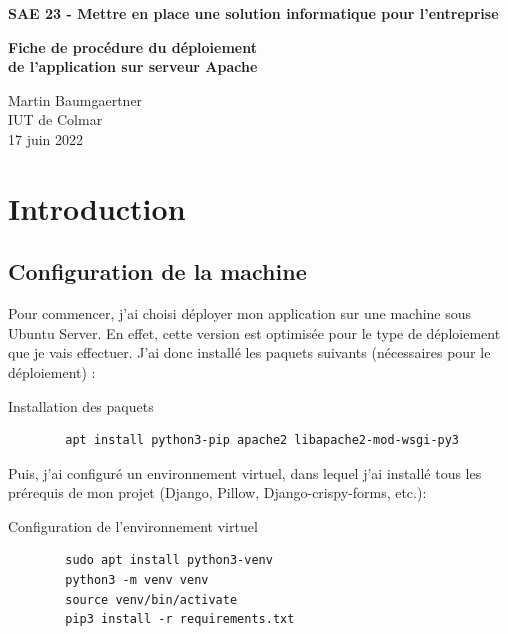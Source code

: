 \documentclass[12pt, a4paper]{article}
\begin{document}
\begin{titlepage}
    \begin{center}
        \vspace*{1cm}
 
        \textbf{\Large SAE 23 - Mettre en place une solution informatique pour l'entreprise}
 
      
             
        \vspace{6.5cm}
 
        \textbf{Fiche de procédure du déploiement\\
        de l'application sur serveur Apache}
 
        \vfill
             
       
             
        \vspace{3cm}
        Martin Baumgaertner\\
        IUT de Colmar\\
        17 juin 2022
    \end{center}
 \end{titlepage}
 \newpage
 \tableofcontents
 \newpage
 \section{Introduction}
    \subsection{Configuration de la machine}
    Pour commencer, j'ai choisi déployer mon application sur
    une machine sous Ubuntu Server. En effet, cette version est optimisée
    pour le type de déploiement que je vais effectuer. 
    J'ai donc installé les paquets suivants (nécessaires pour le déploiement) :
    \begin{listing}[H]
        \caption{Installation des paquets}
        \label{lst:paquets}
        \begin{verbatim}
        apt install python3-pip apache2 libapache2-mod-wsgi-py3
        \end{verbatim}
    \end{listing}
    Puis, j'ai configuré un environnement virtuel, dans lequel j'ai installé 
    tous les prérequis de mon projet (Django, Pillow, Django-crispy-forms, etc.):
    \begin{listing}[H]
        \caption{Configuration de l'environnement virtuel}
        \label{lst:environnement}
        \begin{verbatim}
        sudo apt install python3-venv
        python3 -m venv venv
        source venv/bin/activate
        pip3 install -r requirements.txt
        \end{verbatim}
    \end{listing}
\end{document}
